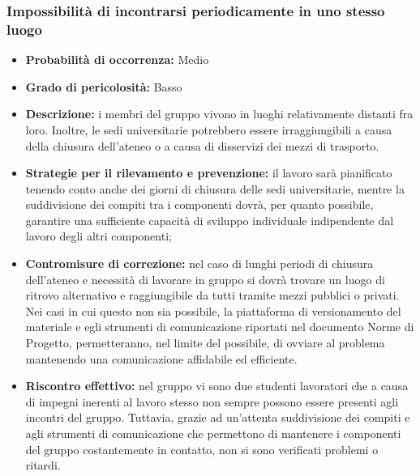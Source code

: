 \subsubsection{Impossibilità di incontrarsi periodicamente in uno stesso luogo}
\hypertarget{subsubsect:incontri}{}
\begin{itemize}
\item \textbf{Probabilità di occorrenza:} Medio
\item \textbf{Grado di pericolosità:} Basso
\item \textbf{Descrizione:} i membri del gruppo vivono in luoghi relativamente distanti fra loro. Inoltre, le sedi universitarie potrebbero essere irraggiungibili a causa della chiusura dell'ateneo o a causa di disservizi dei mezzi di trasporto.

\item \textbf{Strategie per il rilevamento e prevenzione:}  il lavoro sarà pianificato tenendo conto anche dei giorni di chiusura delle sedi universitarie, mentre la suddivisione dei compiti tra i componenti dovrà, per quanto possibile, garantire una sufficiente capacità di sviluppo individuale indipendente dal lavoro degli altri componenti;

\item \textbf{Contromisure di correzione:} nel caso di lunghi periodi di chiusura dell'ateneo e necessità di lavorare in gruppo si dovrà trovare un luogo di ritrovo alternativo e raggiungibile da tutti tramite mezzi pubblici o privati. Nei casi in cui questo non sia possibile, la piattaforma di versionamento del materiale e egli strumenti di comunicazione riportati nel documento Norme di Progetto, permetteranno, nel limite del possibile, di ovviare al problema mantenendo una comunicazione affidabile ed efficiente.

\item \textbf{Riscontro effettivo:} nel gruppo vi sono due studenti lavoratori che a causa di impegni inerenti al lavoro stesso non sempre possono essere presenti agli incontri del gruppo. Tuttavia, grazie ad un'attenta suddivisione dei compiti e agli strumenti di comunicazione che permettono di mantenere i componenti del gruppo costantemente in contatto, non si sono verificati problemi o ritardi.
\end{itemize}

